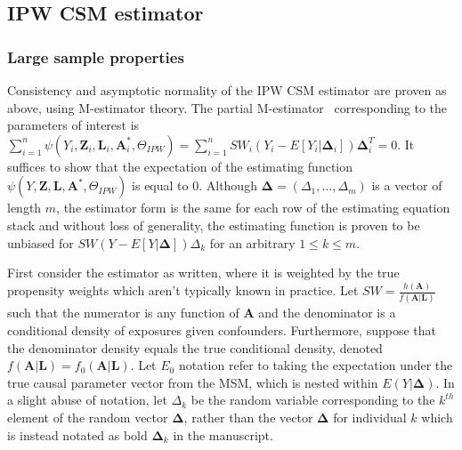 \documentclass[12pt]{article}
\begin{document}
\subsection{IPW CSM estimator}

\subsubsection{Large sample properties}

Consistency and asymptotic normality of the IPW CSM estimator are proven as above, using M-estimator theory. The partial M-estimator~\citep{stefanski2002} corresponding to the parameters of interest is $\sum_{i=1}^{n} \psi(Y_{i}, \bm{Z}_{i}, \bm{L}_{i}, \bm{A}^{*}_{i}, \Theta_{IPW}) = \sum_{i=1}^{n} SW_{i}(Y_{i} - E[Y_{i} | \bm{\Delta}_{i}])\bm{\Delta}_{i}^{T} = 0$. It suffices to show that the expectation of the estimating function $\psi(Y, \bm{Z}, \bm{L}, \bm{A}^{*}, \Theta_{IPW})$ is equal to 0. Although $\bm{\Delta} = (\Delta_{1}, ..., \Delta_{m})$ is a vector of length $m$, the estimator form is the same for each row of the estimating equation stack and without loss of generality, the estimating function is proven to be unbiased for $SW(Y - E[Y | \bm{\Delta}])\Delta_{k}$ for an arbitrary $1 \leq k \leq m$.

First consider the estimator as written, where it is weighted by the true propensity weights which aren't typically known in practice. Let $SW = \frac{h(\bm{A})}{f(\bm{A} | \bm{L})}$ such that the numerator is any function of $\bm{A}$ and the denominator is a conditional density of exposures given confounders. Furthermore, suppose that the denominator density equals the true conditional density, denoted $f(\bm{A} | \bm{L}) = f_{0}(\bm{A} | \bm{L})$. Let $E_{0}$ notation refer to taking the expectation under the true causal parameter vector from the MSM, which is nested within $E(Y | \bm{\Delta})$. In a slight abuse of notation, let $\Delta_{k}$ be the random variable corresponding to the $k^{th}$ element of the random vector $\bm{\Delta}$, rather than the vector $\bm{\Delta}$ for individual $k$ which is instead notated as bold $\bm{\Delta}_{k}$ in the manuscript.
\end{document}
